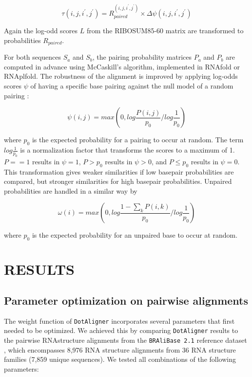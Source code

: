 \documentclass[a4paper,twoside]{article}
\newcommand\dotaligner{\texttt{DotAligner}}
\newcommand\bralibase{\texttt{BRAliBase 2.1}}
\begin{document}
\begin{equation}\label{eq10}
	\tau(i,j,i^\prime,j^\prime) = R_{paired}^{(i,j,i^\prime,j^\prime)}
\times \Delta \psi(i,j,i^\prime,j^\prime)
\end{equation}

Again the log-odd scores $L$ from the RIBOSUM85-60 matrix \cite{Klein14499004}
are transformed to probabilities $R_{paired}$.

For both sequences $S_a$ and $S_b$, the pairing probability matrices $P_a$ and
$P_b$ are computed in advance using McCaskill's algorithm, implemented in
RNAfold or RNAplfold. The robustness of the alignment is improved by applying
log-odds scores $\psi$ of having a specific base pairing against the null model
of a random pairing \cite{Will17432929}:

\begin{equation}\label{eq11}
	\psi(i,j) = max \left( 0, log \frac{P(i,j)}{p_0} / log \frac{1}{p_0} \right)
\end{equation}

where $p_0$ is the expected probability for a pairing to occur at random. The
term $log \frac{1}{p_0}$ is a normalization factor that transforms the scores to
a maximum of 1. $P==1$ results in $\psi=1$, $P>p_0$ results in $\psi>0$, and $P\le
p_0$ results in $\psi=0$.  This transformation gives weaker similarities if low
basepair probabilities are compared, but stronger similarities for high basepair
probabilities. Unpaired probabilities are handled in a similar way by

\begin{equation}\label{eq12}
	\omega(i) = max \left( 0, log \frac{1 - \sum_k P(i,k)}{p_0} / log \frac{1}{p_0} \right)
\end{equation}

where $p_0$ is the expected probability for an unpaired base to occur at
random.


\section{\uppercase{Results}}
\subsection{Parameter optimization on pairwise alignments}
The weight function of \dotaligner{} incorporates several parameters that first needed 
to be optimized. We achieved this by comparing \dotaligner{} results to the pairwise 
RNAstructure alignments from the \bralibase{} reference dataset \cite{Wilm2006enhanced}, 
which encompasses 8,976 RNA structure alignments from 36 RNA structure families 
(7,859 unique sequences). We tested all combinations of the following parameters:
\end{document}
